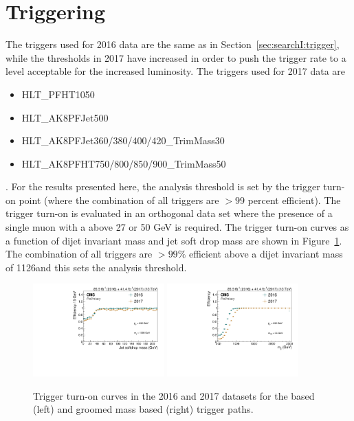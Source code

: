 \section{Triggering}
\label{sec:searchIII:trigger}
The triggers used for 2016 data are the same as in Section~\ref{sec:searchI:trigger}, while the thresholds in 2017 have increased in order to push the trigger rate to a level acceptable for the increased luminosity. The triggers used for 2017 data are
\begin{itemize}
\item {HLT\_PFHT1050}
\item {HLT\_AK8PFJet500}
\item {HLT\_AK8PFJet360/380/400/420\_TrimMass30}
\item {HLT\_AK8PFHT750/800/850/900\_TrimMass50}
\end{itemize}.
For the results presented here, the analysis threshold is set by the trigger turn-on point (where the combination of all triggers are $>99$ percent efficient). The trigger turn-on is evaluated in an orthogonal data set where the presence of a single muon with a \PT above 27 or 50 GeV is required. The trigger turn-on curves as a function of dijet invariant mass and jet soft drop mass are shown in Figure~\ref{fig:searchIII:trigturnon}.
The combination of all triggers are $>99\%$ efficient above a dijet invariant mass of 1126\GeV and this sets the analysis threshold. 
\begin{figure}[h!]
\centering 
\includegraphics[width=0.45\textwidth]{figures/analysis/search3/B2G-18-002/Combined_mj1_16vs17.pdf}
\includegraphics[width=0.45\textwidth]{figures/analysis/search3/B2G-18-002/Combined_mjj_16vs17.pdf}
\caption{Trigger turn-on curves in the 2016 and 2017 datasets for the \HT based (left) and groomed mass based (right) trigger paths.}
\label{fig:searchIII:trigturnon}
\end{figure}


